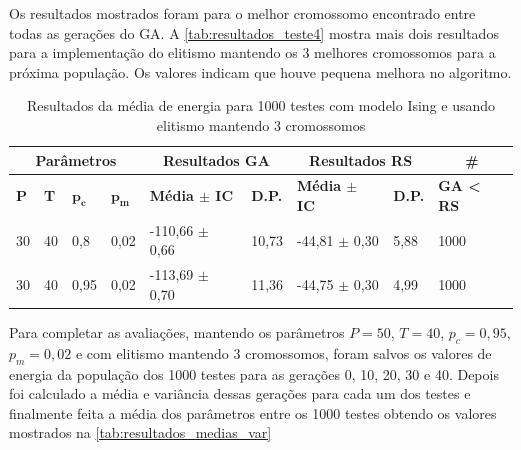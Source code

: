 Os resultados mostrados foram para o melhor cromossomo encontrado entre todas as gerações do GA. A \autoref{tab:resultados_teste4} mostra mais dois resultados para a implementação do elitismo mantendo os 3 melhores cromossomos para a próxima população. Os valores indicam que houve pequena melhora no algoritmo.

\begin{table}[htb]
	\centering
	\begin{tabular}{|l|l|l|l|l|l|l|l|l|}
		\hline
		\multicolumn{4}{|c|}{\textbf{Parâmetros}}                                                    & \multicolumn{2}{c|}{\textbf{Resultados GA}}                                        & \multicolumn{2}{c|}{\textbf{Resultados RS}}                                        & \multicolumn{1}{c|}{\textbf{\#}}                      \\ \hline
		\textbf{P} & \textbf{T} & $\bm{p_c}$ & $\bm{p_m}$ & \textbf{Média $\pm$ IC} & \textbf{D.P.} & \textbf{Média $\pm$ IC} & \textbf{D.P.} & \textbf{GA < RS} \\ \hline
		30                          & 40                          & 0,8        & 0,02       & -110,66 $\pm$ 0,66                           & 10,73                          & -44,81 $\pm$ 0,30                            & 5,88                           & 1000                                      \\ \hline
		30                          & 40                          & 0,95        & 0,02       & -113,69 $\pm$ 0,70                            & 11,36                          & -44,75 $\pm$ 0,30                            & 4,99                           & 1000                                      \\ \hline
	\end{tabular}
	\caption{Resultados da média de energia para 1000 testes com modelo Ising e usando elitismo mantendo 3 cromossomos}
	\label{tab:resultados_teste4}
\end{table}


Para completar as avaliações, mantendo os parâmetros \(P = 50\), \(T = 40\), \(p_c = 0,95\), \(p_m = 0,02\) e com elitismo mantendo 3 cromossomos, foram salvos os valores de energia da população dos 1000 testes para as gerações 0, 10, 20, 30 e 40. Depois foi calculado a média e variância dessas gerações para cada um dos testes e finalmente feita a média dos parâmetros entre os 1000 testes obtendo os valores mostrados na \autoref{tab:resultados_medias_var}

